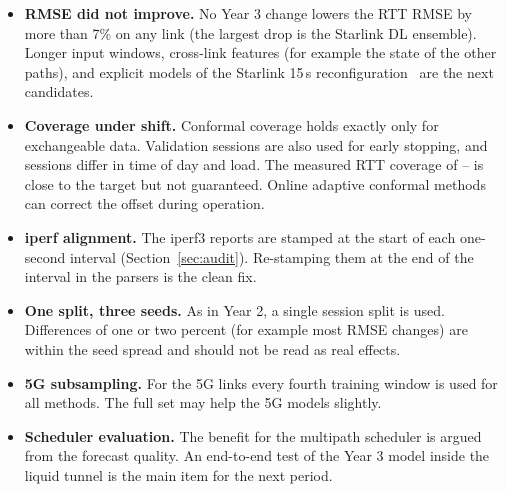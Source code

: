 \begin{itemize}[leftmargin=*]
  \item \textbf{RMSE did not improve.} No Year 3 change lowers the RTT RMSE by more than 7\% on any link (the largest drop is the Starlink DL ensemble). Longer input windows, cross-link features (for example the state of the other paths), and explicit models of the Starlink 15\,s reconfiguration~\cite{tanveer2023making} are the next candidates.
  \item \textbf{Coverage under shift.} Conformal coverage holds exactly only for exchangeable data. Validation sessions are also used for early stopping, and sessions differ in time of day and load. The measured RTT coverage of \PICPMin--\PICPMax{} is close to the target but not guaranteed. Online adaptive conformal methods~\cite{gibbs2021adaptive} can correct the offset during operation.
  \item \textbf{iperf alignment.} The iperf3 reports are stamped at the start of each one-second interval (Section~\ref{sec:audit}). Re-stamping them at the end of the interval in the parsers is the clean fix.
  \item \textbf{One split, three seeds.} As in Year 2, a single session split is used. Differences of one or two percent (for example most RMSE changes) are within the seed spread and should not be read as real effects.
  \item \textbf{5G subsampling.} For the 5G links every fourth training window is used for all methods. The full set may help the 5G models slightly.
  \item \textbf{Scheduler evaluation.} The benefit for the multipath scheduler is argued from the forecast quality. An end-to-end test of the Year 3 model inside the liquid tunnel is the main item for the next period.
\end{itemize}
